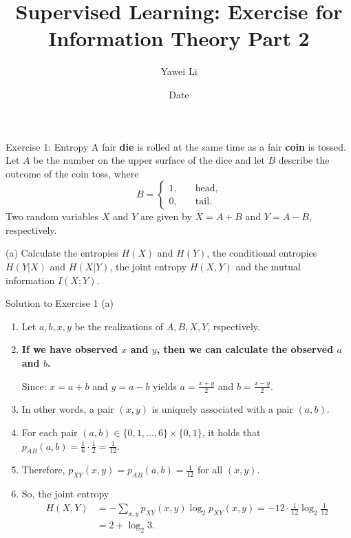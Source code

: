 \documentclass[aspectratio=169]{beamer}
\title[]{\textbf{Supervised Learning: Exercise for \\ Information Theory Part 2}}
\author{Yawei Li}
\institute[LMU]
{
\\
  \texttt{yawei.li@stat.uni-muenchen.de}
}
\date{Date}
\newcommand{\HX}{H(X)}
\newcommand{\HY}{H(Y)}
\newcommand{\HXY}{H(X, Y)}
\newcommand{\HXcY}{H(X | Y)}
\newcommand{\HYcX}{H(Y|X)}
\newcommand{\IXY}{I(X;Y)}
\begin{document}
\begin{frame}
\titlepage

\end{frame}


\begin{frame}{Exercise 1: Entropy}
	A fair \textbf{die} is rolled at the same time as a fair \textbf{coin} is tossed. Let $A$ be the number on the upper surface of the dice and let $B$ describe the outcome of the coin toss, where
	$$
		B = \begin{cases}
			1, \quad &\text{head,} \\
			0, \quad &\text{tail.}
		\end{cases}
	$$
	Two random variables $X$ and $Y$ are given by $X = A + B$ and $Y = A - B$, respectively.
	
	(a) Calculate the entropies $\HX$ and $\HY$, the conditional entropies $\HYcX$ and $\HXcY$, the joint entropy $\HXY$ and the mutual information $\IXY$.
\end{frame}

\begin{frame}{Solution to Exercise 1 (a)}
	\begin{enumerate}
		\item Let $a, b , x, y$ be the realizations of $A, B, X, Y$, rspectively.
		\item \textbf{If we have observed $x$ and $y$, then we can calculate the observed $a$ and $b$.}
			
			Since: $x = a + b$ and $y = a - b$ yields $a = \frac{x + y}{2}$ and $b = \frac{x - y}{2}$.
		\item In other words, a pair $(x, y)$ is uniquely associated with a pair $(a, b)$.
		\item For each pair $(a, b) \in \{0, 1, \ldots, 6 \} \times \{0, 1\}$, it holds that $p_{AB}(a, b) = \frac{1}{6} \cdot \frac{1}{2} = \frac{1}{12}$.
		\item Therefore, $p_{XY}(x, y) = p_{AB}(a, b) = \frac{1}{12}$ for all $(x, y)$.
		\item So, the joint entropy
			\begin{align*}
				\HXY &= - \sum_{x, y} p_{XY}(x, y) \log_2 p_{XY}(x, y) = -12 \cdot \frac{1}{12} \log_2 \frac{1}{12} \\
				&= 2 + \log_2 3.
			\end{align*}

	\end{enumerate}
	
\end{frame}
\end{document}
